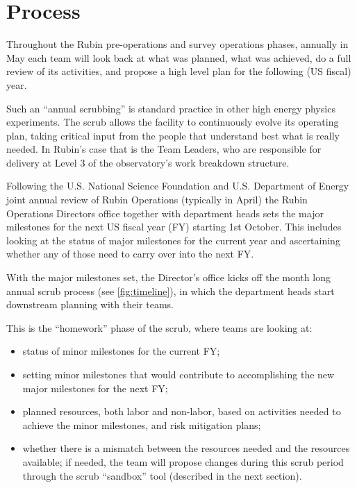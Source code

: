 \section{Process} \label{sec:process}

Throughout the Rubin pre-operations and survey operations phases, annually in May each team will look back at what was planned, what was achieved, do a full review of its activities, and propose a high level plan for the following (US fiscal) year.

Such an ``annual scrubbing'' is standard practice in other high energy physics experiments. 
The scrub allows the facility to continuously evolve its operating plan, taking critical input from the people that understand best what is really needed. 
In Rubin’s case that is the Team Leaders, who are responsible for delivery at Level 3 of the observatory's work breakdown structure.

Following the U.S. National Science Foundation and U.S. Department of Energy joint annual review of Rubin Operations (typically in April) the Rubin Operations Directors office together with department heads sets the major milestones for the next US fiscal year (FY) starting 1st October. 
This includes looking at the status of major milestones for the current year and ascertaining whether any of those need to carry over into the next FY.

With the major milestones set, the Director’s office kicks off the month long annual scrub process (see \autoref{fig:timeline}), in which the department heads start downstream planning with their teams. 

This is the ``homework'' phase of the scrub, where teams are looking at:
\begin{itemize}
\item status of minor milestones for the current FY;
\item setting minor milestones that would contribute to accomplishing the new major milestones for the next FY;
\item planned resources, both labor and non-labor, based on activities needed to achieve the minor milestones, and risk mitigation plans;
\item whether there is a mismatch between the resources needed and the resources available; if needed, the team will propose changes during this scrub period through the scrub ``sandbox'' tool (described in the next section).
\end{itemize}

